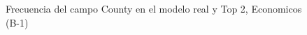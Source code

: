 \begin{figure}[H]
    \centering
    
    \caption{Frecuencia del campo County en el modelo real y Top 2, Economicos (B-1)}
    \label{frecuency-County-top2}
\end{figure}